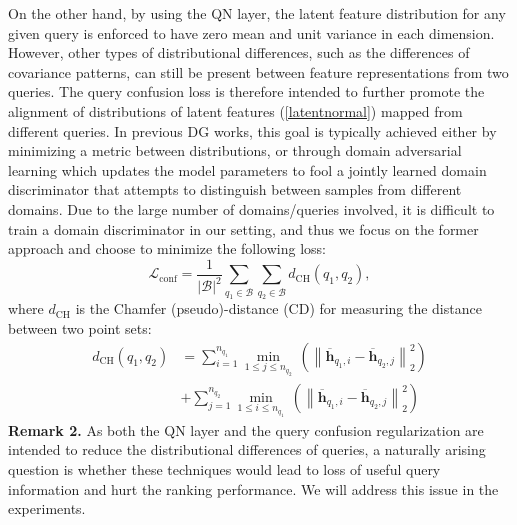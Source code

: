 \documentclass[letterpaper]{article} %
\begin{document}
On the other hand, by using the QN layer, the latent feature distribution for any given query is enforced to have zero mean and unit variance in each dimension. However, other types of distributional differences, such as the differences of covariance patterns, can still be present between feature representations from two queries. The query confusion loss is therefore intended to further promote the alignment of distributions of latent features (\ref{latentnormal}) mapped from different queries. In previous DG works, this goal is typically achieved either by minimizing a metric between distributions, or through domain adversarial learning \cite{ganin2016domain,cohen2018cross} which updates the model parameters to fool a jointly learned domain discriminator that attempts to distinguish between samples from different domains. Due to the large number of domains/queries involved, it is difficult to train a domain discriminator in our setting, and thus we focus on the former approach and choose to minimize the following loss:
\begin{equation}
{{\mathcal{L}}_{\text{conf}}}=\frac{1}{{{\left| \mathcal{B} \right|}^{2}}}\sum\limits_{{{q}_{1}}\in \mathcal{B}}{\sum\limits_{{{q}_{2}}\in \mathcal{B}}{{{d}_{\text{CH}}}\left( {{q}_{1}},{{q}_{2}} \right)}},
\end{equation}
where ${{d}_{\text{CH}}}$ is the Chamfer (pseudo)-distance (CD) \cite{fan2017point} for measuring the distance between two point sets:
\begin{equation}
\begin{aligned}
{{d}_{\text{CH}}}\left( {{q}_{1}},{{q}_{2}} \right)&=\sum\limits_{i=1}^{{{n}_{{{q}_{1}}}}}{\underset{1\le j\le {{n}_{{{q}_{2}}}}}{\mathop{\min }}\,\left( \left\| {{\overline{\mathbf{h}}}_{{{q}_{1}},i}}-{{\overline{\mathbf{h}}}_{{{q}_{2}},j}} \right\|_{2}^{2} \right)} \\
& +\sum\limits_{j=1}^{{{n}_{{{q}_{2}}}}}{\underset{1\le i\le {{n}_{{{q}_{1}}}}}{\mathop{\min }}\,\left( \left\| {{\overline{\mathbf{h}}}_{{{q}_{1}},i}}-{{\overline{\mathbf{h}}}_{{{q}_{2}},j}} \right\|_{2}^{2} \right)}
\end{aligned}
\end{equation}
\noindent \textbf{Remark 2.} As both the QN layer and the query confusion regularization are intended to reduce the distributional differences of queries, a naturally arising question is whether these techniques would lead to loss of useful query information and hurt the ranking performance. We will address this issue in the experiments.
\end{document}
